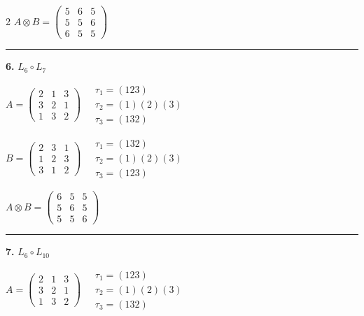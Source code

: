 \begin{multicols}{2}
$A \otimes B = \begin{pmatrix} 5 & 6 & 5 \\ 5 & 5 & 6 \\ 6 & 5 & 5 \end{pmatrix}$

\vspace{0.3em}
\hrule
\vspace{0.3em}

\noindent\textbf{6.} $L_{6} \circ L_{7}$

$A = \begin{pmatrix} 2 & 1 & 3 \\ 3 & 2 & 1 \\ 1 & 3 & 2 \end{pmatrix} \quad \begin{matrix} \tau_{1}=(1 2 3) \\ \tau_{2}=(1)(2)(3) \\ \tau_{3}=(1 3 2) \end{matrix}$

$B = \begin{pmatrix} 2 & 3 & 1 \\ 1 & 2 & 3 \\ 3 & 1 & 2 \end{pmatrix} \quad \begin{matrix} \tau_{1}=(1 3 2) \\ \tau_{2}=(1)(2)(3) \\ \tau_{3}=(1 2 3) \end{matrix}$

$A \otimes B = \begin{pmatrix} 6 & 5 & 5 \\ 5 & 6 & 5 \\ 5 & 5 & 6 \end{pmatrix}$

\vspace{0.3em}
\hrule
\vspace{0.3em}

\noindent\textbf{7.} $L_{6} \circ L_{10}$

$A = \begin{pmatrix} 2 & 1 & 3 \\ 3 & 2 & 1 \\ 1 & 3 & 2 \end{pmatrix} \quad \begin{matrix} \tau_{1}=(1 2 3) \\ \tau_{2}=(1)(2)(3) \\ \tau_{3}=(1 3 2) \end{matrix}$


\end{multicols}

